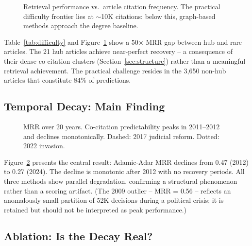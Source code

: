 \documentclass[11pt]{article}
\begin{document}
\begin{figure}[t]
\centering

\caption{Retrieval performance vs.\ article citation frequency. The practical difficulty frontier lies at $\sim$10K citations: below this, graph-based methods approach the degree baseline.}
\label{fig:difficulty}
\end{figure}

Table~\ref{tab:difficulty} and Figure~\ref{fig:difficulty} show a 50$\times$ MRR gap between hub and rare articles.
The 21 hub articles achieve near-perfect recovery -- a consequence of their dense co-citation clusters (Section~\ref{sec:structure}) rather than a meaningful retrieval achievement.
The practical challenge resides in the 3{,}650 non-hub articles that constitute 84\% of predictions.

\subsection{Temporal Decay: Main Finding}

\begin{figure}[t]
\centering

\caption{MRR over 20 years. Co-citation predictability peaks in 2011--2012 and declines monotonically. Dashed: 2017 judicial reform. Dotted: 2022 invasion.}
\label{fig:temporal}
\end{figure}

Figure~\ref{fig:temporal} presents the central result: Adamic-Adar MRR declines from 0.47 (2012) to 0.27 (2024).
The decline is monotonic after 2012 with no recovery periods.
All three methods show parallel degradation, confirming a structural phenomenon rather than a scoring artifact.
(The 2009 outlier -- MRR = 0.56 -- reflects an anomalously small partition of 52K decisions during a political crisis; it is retained but should not be interpreted as peak performance.)

\subsection{Ablation: Is the Decay Real?}
\end{document}
